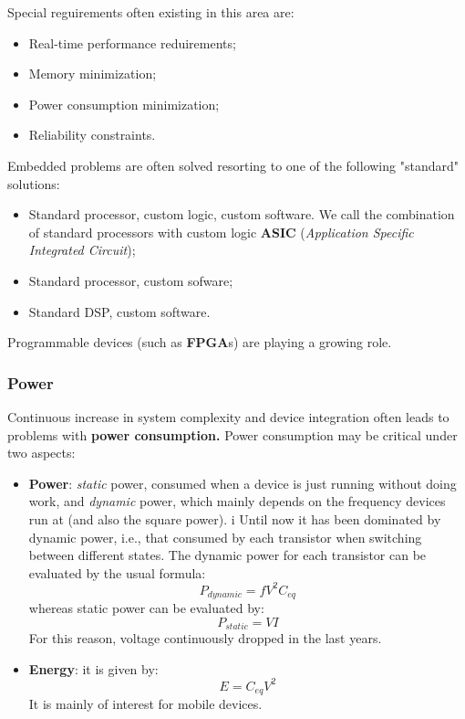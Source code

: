 \documentclass[a4paper,11pt]{article}
\begin{document}
\begin{itemize}
Special reguirements often existing in this area are:
\begin{itemize}
\item Real-time performance reduirements;
\item Memory minimization;
\item Power consumption minimization;
\item Reliability constraints.
\end{itemize}

 Embedded problems are often solved resorting to one of the following "standard" solutions:
\begin{itemize}
	\item Standard processor, custom logic, custom software. We call the combination of standard processors with custom logic \textbf{ASIC} (\textit{Application Specific Integrated Circuit});
	\item Standard processor, custom sofware;
	\item Standard DSP, custom software.
\end{itemize}

Programmable devices (such as \textbf{FPGA}s) are playing a growing
role.

\end{itemize}

\subsubsection{Power}

Continuous increase in system complexity and device integration often leads to problems with \textbf{power consumption.}
Power consumption may be critical under two aspects:
\begin{itemize}
	\item \textbf{Power}: \textit{static} power, consumed when a device is just running without doing work, and \textit{dynamic} power, which mainly depends on the frequency devices run at (and also the square power). i
	Until now it has been dominated by dynamic power, i.e., that consumed by each transistor when switching between different states.
The dynamic power for each transistor can be evaluated by the usual formula:
$$
P_{dynamic} = f V^2 C_{eq}
$$
whereas static power can be evaluated by:
$$
P_{static} = V I
$$
For this reason, voltage continuously dropped in the last years.

	\item \textbf{Energy}: it is given by:
$$
E = C_{eq} V^2 
$$
It is mainly of interest for mobile devices.
\end{itemize}
\end{document}
